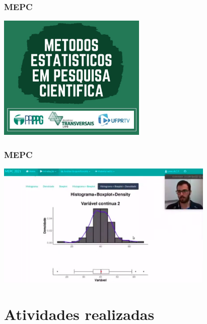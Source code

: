 \documentclass[10pt,
  aspectratio=169,
  serif,
  mathserif,
  professionalfont,
  compress,
  handout,
  ]{beamer}\usepackage[]{graphicx}\usepackage[]{color}
\begin{document}

\begin{frame}

\frametitle{MEPC}

\begin{center}
  \includegraphics[height=6cm]{img/mepc.jpg}
\end{center}

\end{frame}


\begin{frame}

\frametitle{MEPC}

\begin{center}
  \includegraphics[height=6cm]{img/mepc2.png}
\end{center}

\end{frame}


\section{Atividades realizadas}
\end{document}
